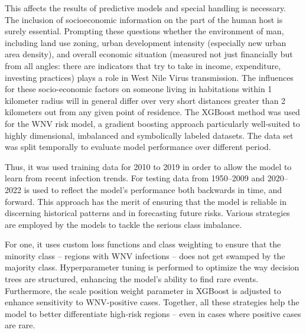 \documentclass[
]{krantz}
\begin{document}
This affects the results of predictive models and special handling is necessary. The inclusion of socioeconomic information on the part of the human host is surely essential. Prompting these questions whether the environment of man, including land use zoning, urban development intensity (especially new urban area density), and overall economic situation (measured not just financially but from all angles: there are indicators that try to take in income, expenditure, investing practices) plays a role in West Nile Virus transmission. The influences for these socio-economic factors on someone living in habitations within 1 kilometer radius will in general differ over very short distances greater than 2 kilometers out from any given point of residence. The XGBoost method was used for the WNV risk model, a gradient boosting approach particularly well-suited to highly dimensional, imbalanced and symbolically labeled datasets. The data set was split temporally to evaluate model performance over different period.

Thus, it was used training data for 2010 to 2019 in order to allow the model to learn from recent infection trends. For testing data from 1950--2009 and 2020--2022 is used to reflect the model's performance both backwards in time, and forward. This approach has the merit of ensuring that the model is reliable in discerning historical patterns and in forecasting future risks. Various strategies are employed by the models to tackle the serious class imbalance.

For one, it uses custom loss functions and class weighting to ensure that the minority class -- regions with WNV infections -- does not get swamped by the majority class. Hyperparameter tuning is performed to optimize the way decision trees are structured, enhancing the model's ability to find rare events. Furthermore, the scale position weight parameter in XGBoost is adjusted to enhance sensitivity to WNV-positive cases. Together, all these strategies help the model to better differentiate high-risk regions -- even in cases where positive cases are rare.
\end{document}
